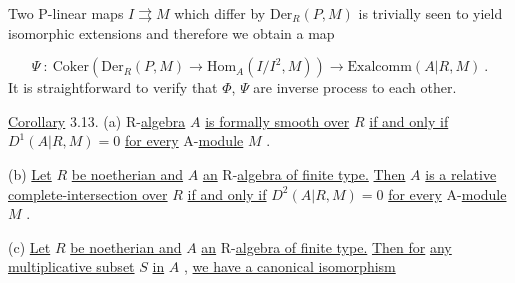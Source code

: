 \begin{center}
\end{center}
Two P-linear maps  $I \rightrightarrows M$  which differ by  $\mathrm{Der}_R(P, M)$  is trivially seen to yield isomorphic extensions and therefore we obtain a map

\begin{equation*}
\Psi \ : \ \mathrm{Coker}(\mathrm{Der}_R(P, M) \to \mathrm{Hom}_A(I/I^2, M)) \to \mathrm{Exalcomm}(A|R, M)  \ .
\end{equation*}
It is straightforward to verify that  $\Phi$, $\Psi$  are inverse process to each other.

\underline{Corollary} 3.13.  (a)  R-\underline{algebra}  $A$  \underline{is formally smooth over}  $R$  \underline{if and only if} $D^1(A|R, M) = 0$  \underline{for every} A-\underline{module}  $M$  .

(b)  \underline{Let}  $R$  \underline{be noetherian and}  $A$  \underline{an} R-\underline{algebra of finite type.} \underline{Then}  $A$ \underline{is a relative complete-intersection over}  $R$  \underline{if and only if}  $D^2(A|R, M) = 0$  \underline{for every} A-\underline{module}  $M$  .

(c)  \underline{Let}  $R$  \underline{be noetherian and}  $A$  \underline{an} R-\underline{algebra of finite type.} \underline{Then for} \underline{any multiplicative subset}  $S$  \underline{in}  $A$  , \underline{we have a canonical isomorphism}

